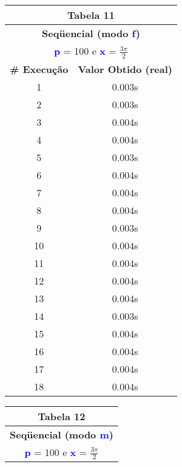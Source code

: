 \documentclass[11pt]{article}
\begin{document}
\begin{table}[!h]
	\begin{center}
		\begin{minipage}{0.48\textwidth}
			\begin{tabular}{| c | c |}
			\hline
			\multicolumn{2}{|c|}{\textbf{Tabela 11}} \\ \hline
			\multicolumn{2}{|c|}{\textbf{Seqüencial (modo \textbf{\textcolor{blue}{f}})}} \\
			\multicolumn{2}{|c|}{\textbf{\textcolor{blue}{p}} = 100 e \textbf{\textcolor{blue}{x}} = $\frac{3\pi}{2}$} \\ [0.2ex]
			\hline
				\textbf{\# Execução} &  \textbf{Valor Obtido (real)} \\ \hline
				1 & 0.003s \\ \hline
				2 & 0.003s \\ \hline
				3 & 0.004s \\ \hline
				4 & 0.004s \\ \hline
				5 & 0.003s \\ \hline
				6 & 0.004s \\ \hline
				7 & 0.004s \\ \hline
				8 & 0.004s \\ \hline
				9 & 0.003s \\ \hline
				10 & 0.004s \\ \hline
				11 & 0.004s \\ \hline
				12 & 0.004s \\ \hline
				13 & 0.004s \\ \hline
				14 & 0.003s \\ \hline
				15 & 0.004s \\ \hline
				16 & 0.004s \\ \hline
				17 & 0.004s \\ \hline
				18 & 0.004s \\ \hline
			\end{tabular}
		\end{minipage}
		\begin{minipage}{0.48\textwidth}
			\begin{tabular}{| c | c |}
			\hline
			\multicolumn{2}{|c|}{\textbf{Tabela 12}} \\ \hline
			\multicolumn{2}{|c|}{\textbf{Seqüencial (modo \textbf{\textcolor{blue}{m}})}} \\
			\multicolumn{2}{|c|}{\textbf{\textcolor{blue}{p}} = 100 e \textbf{\textcolor{blue}{x}} = $\frac{3\pi}{2}$} \\ [0.2ex]
			\hline

\end{tabular}
\end{minipage}
\end{center}
\end{table}
\end{document}
